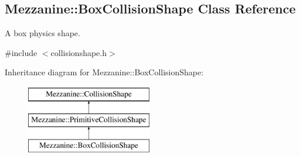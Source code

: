 \hypertarget{classMezzanine_1_1BoxCollisionShape}{
\subsection{Mezzanine::BoxCollisionShape Class Reference}
\label{classMezzanine_1_1BoxCollisionShape}
}


A box physics shape.  




{\ttfamily \#include $<$collisionshape.h$>$}

Inheritance diagram for Mezzanine::BoxCollisionShape:\begin{figure}[H]
\begin{center}
\leavevmode
\includegraphics[height=3.000000cm]{classMezzanine_1_1BoxCollisionShape}
\end{center}
\end{figure}
